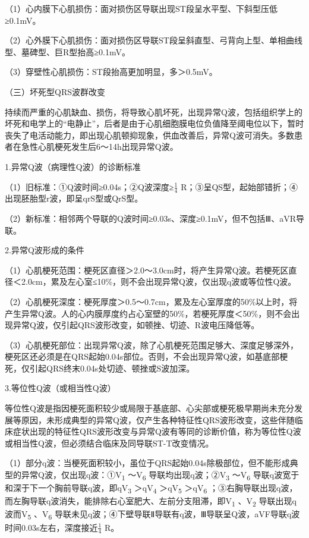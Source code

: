 （1）心内膜下心肌损伤：面对损伤区导联出现ST段呈水平型、下斜型压低≥0.1mV。

（2）心外膜下心肌损伤：面对损伤区导联ST段呈斜直型、弓背向上型、单相曲线型、墓碑型、巨R型抬高≥0.1mV。

（3）穿壁性心肌损伤：ST段抬高更加明显，多＞0.5mV。

（三）坏死型QRS波群改变

持续而严重的心肌缺血、损伤，将导致心肌坏死，出现异常Q波，包括组织学上的坏死和电学上的“电静止”，后者是由于心肌细胞膜电位负值降至阈电位以下，暂时丧失了电活动能力，即出现心肌顿抑现象，供血改善后，异常Q波可消失。多数患者在急性心肌梗死发生后6～14h出现异常Q波。

1.异常Q波（病理性Q波）的诊断标准

（1）旧标准：①Q波时间≥0.04s；②Q波深度≥$\frac{1}{4}$
R；③呈QS型，起始部错折；④出现胚胎型r波，即呈qrS型或QrS型。

（2）新标准：相邻两个导联的Q波时间≥0.03s、深度≥0.1mV，但不包括Ⅲ、aVR导联。

2.异常Q波形成的条件

（1）心肌梗死范围：梗死区直径＞2.0～3.0cm时，将产生异常Q波。若梗死区直径＜2.0cm，累及左心室≤10\%，则不会出现异常Q波，仅出现q波或等位性Q波。

（2）心肌梗死深度：梗死厚度＞0.5～0.7cm，累及左心室厚度的50\%以上时，将产生异常Q波。人的心内膜厚度约占心室壁的50\%，若梗死厚度＜50\%，则不会出现异常Q波，仅引起QRS波形改变，如顿挫、切迹、R波电压降低等。

（3）心肌梗死部位：出现异常Q波，除了心肌梗死范围足够大、深度足够深外，梗死区还必须是在QRS起始0.04s部位。否则，不会出现异常Q波，如基底部梗死，仅引起QRS终末0.04s处切迹、顿挫或S波加深。

3.等位性Q波（或相当性Q波）

等位性Q波是指因梗死面积较少或局限于基底部、心尖部或梗死极早期尚未充分发展等原因，未形成典型的异常Q波，仅产生各种特征性QRS波形改变，这些伴随临床症状出现的特征性QRS波形改变与异常Q波有等同的诊断价值，称为等位性Q波或相当性Q波，但必须结合临床及同导联ST-T改变情况。

（1）部分q波：当梗死面积较小，虽位于QRS起始0.04s除极部位，但不能形成典型的异常Q波，仅出现q波：①V\textsubscript{1}
～V\textsubscript{6} 导联均出现q波；②V\textsubscript{3}
～V\textsubscript{6}
导联q波宽于和深于下一个胸前导联q波，即qV\textsubscript{3}
＞qV\textsubscript{4} ＞qV\textsubscript{5} ＞qV\textsubscript{6}
；③右胸导联出现q波，而左胸导联q波消失，能排除右心室肥大、左前分支阻滞，即V\textsubscript{1}
、V\textsubscript{2} 导联出现q波而V\textsubscript{5}
、V\textsubscript{6}
导联未见q波；④下壁导联Ⅱ导联有q波，Ⅲ导联呈Q波，aVF导联q波时间0.03s左右，深度接近$\frac{1}{4}$
R。

